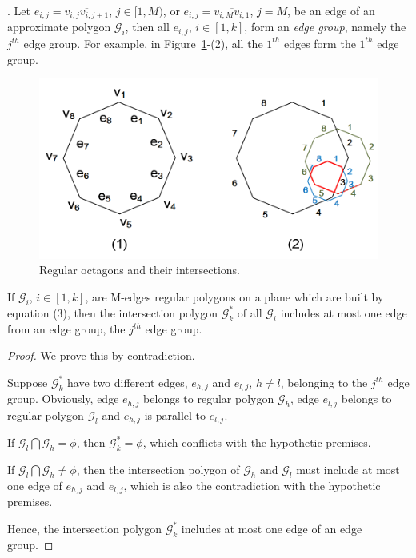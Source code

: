 .
Let $e_{i,j} = \overline{v_{i,j}v_{i,j+1}}$, $j\in [1,M)$, or $e_{i,j} = \overline{v_{i,M}v_{i,1}}$, $j = M$, be an edge of an approximate polygon
$\mathcal{G}_i$, then all $e_{i,j}$, $i\in [1, k]$, form an \emph{edge group}, namely the $j^{th}$ edge group.
For example, in Figure~\ref{fig:polygons}-(2), all the $1^{th}$ edges form the $1^{th}$ edge group.




\begin{figure}[tb!]
\centering
\includegraphics[scale=0.88]{figures/Fig-polygons.png}
\vspace{-1ex}
\caption{\small Regular octagons and their intersections.}
\vspace{-3ex}
\label{fig:polygons}
\end{figure}



\begin{theorem}
\label{prop-rp-intersection}
If $\mathcal{G}_i$, $i \in [1, k]$, are M-edges regular polygons on a plane which are built by equation (3), then the intersection polygon
$\mathcal{G}^*_k$ of all $\mathcal{G}_i$ includes at most one edge from an edge group, \eg the $j^{th}$ edge group.
\end{theorem}


\begin{proof}
We prove this by contradiction.

Suppose $\mathcal{G}^*_k$ have two different edges, $e_{h,j}$ and $e_{l,j}$, $h\ne l$, belonging to the $j^{th}$ edge group. Obviously, edge
$e_{h,j}$ belongs to regular polygon $\mathcal{G}_h$, edge $e_{l,j}$ belongs to regular polygon $\mathcal{G}_l$ and $e_{h,j}$ is parallel to
$e_{l,j}$.

If $\mathcal{G}_l \bigcap \mathcal{G}_h = \phi$, then $\mathcal{G}^*_k=\phi$, which conflicts with the hypothetic premises.

If $\mathcal{G}_l \bigcap \mathcal{G}_h \ne \phi$, then the intersection polygon of $\mathcal{G}_h$ and $\mathcal{G}_l$ must include at most
one edge of $e_{h,j}$ and $e_{l,j}$, which is also the contradiction with the hypothetic premises.

Hence, the intersection polygon $\mathcal{G}^*_k$ includes at most one edge of an edge group.
%
\end{proof}



